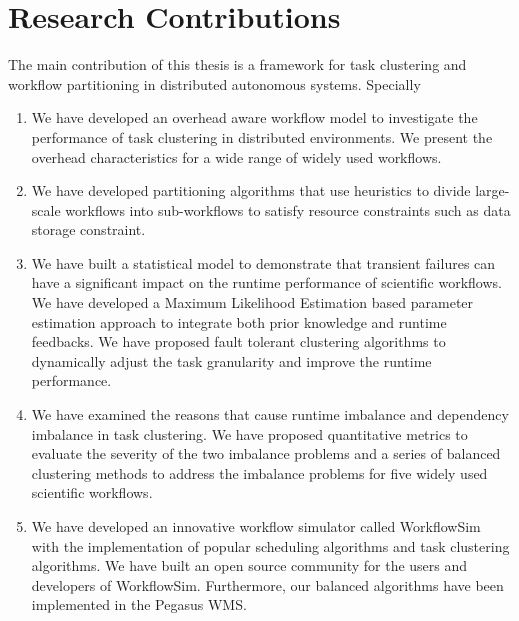 \section{Research Contributions}

The main contribution of this thesis is a framework for task clustering and workflow partitioning in distributed autonomous systems. Specially
\begin{enumerate}
\item We have developed an overhead aware workflow model to investigate the performance of task clustering in distributed environments. We present the overhead characteristics for a wide range of widely used workflows.
\item We have developed partitioning algorithms that use heuristics to divide large-scale workflows into sub-workflows to satisfy resource constraints such as data storage constraint. 
\item We have built a statistical model to demonstrate that transient failures can have a significant impact on the runtime performance of scientific workflows. We have developed a Maximum Likelihood Estimation based parameter estimation approach to integrate both prior knowledge and runtime feedbacks. We have proposed fault tolerant clustering algorithms to dynamically adjust the task granularity and improve the runtime performance. 
\item We have examined the reasons that cause runtime imbalance and dependency imbalance in task clustering. We have proposed quantitative metrics to evaluate the severity of the two imbalance problems and a series of balanced clustering methods to address the imbalance problems for five widely used scientific workflows. 
\item We have developed an innovative workflow simulator called WorkflowSim with the implementation of popular scheduling algorithms and task clustering algorithms. 
We have built an open source community for the users and developers of WorkflowSim. Furthermore, our balanced algorithms have been implemented in the Pegasus WMS. 
\end{enumerate}
 
